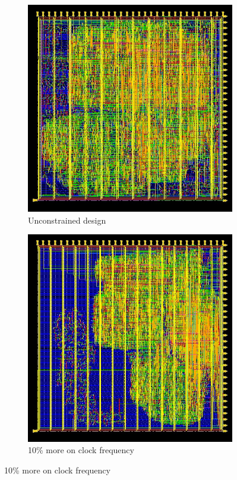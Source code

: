 \begin{figure}[!htbp]
  \centering
  \begin{subfigure}[b]{0.4\linewidth}
\includegraphics[width=\linewidth,scale=0.6,angle=0]{../project/physical_design/images_nopt/DLX_IR_SIZE32_PC_SIZE32_nopt_place_prerouting.jpg}
\caption{Unconstrained design}
\label{fig:placno}
  \end{subfigure}
  \begin{subfigure}[b]{0.4\linewidth}
\includegraphics[width=\linewidth,scale=0.6,angle=0]{../project/physical_design/images_10/DLX_IR_SIZE32_PC_SIZE32_10_place_prerouting.jpg}
\caption{10\% more on clock frequency}
\label{fig:plac10}
  \end{subfigure}
  

\end{figure}
